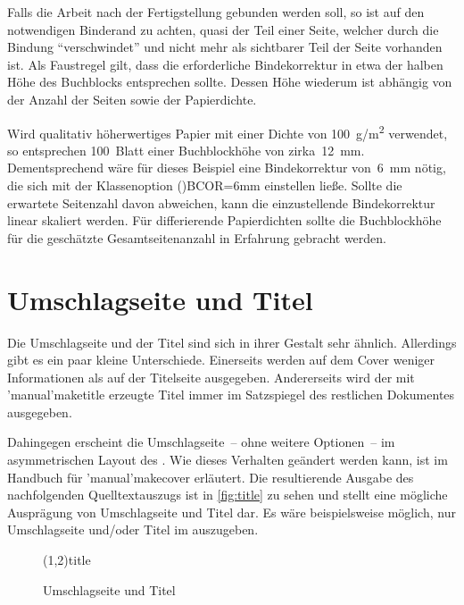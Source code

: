 \documentclass[%
  english,ngerman,%
  cdgeometry=no,DIV=12,%
  cd=false,cdfont=false,cdtitle=true,%
  headings=normal,%
  automark,%
  listof=toc,%
]{tudscrartcl}
\begin{document}
Falls die Arbeit nach der Fertigstellung gebunden werden soll, so ist auf den 
notwendigen Binderand zu achten, quasi der Teil einer Seite, welcher durch die 
Bindung \enquote{verschwindet} und nicht mehr als sichtbarer Teil der Seite 
vorhanden ist. Als Faustregel gilt, dass die erforderliche Bindekorrektur in 
etwa der halben Höhe des Buchblocks entsprechen sollte. Dessen Höhe wiederum 
ist abhängig von der Anzahl der Seiten sowie der Papierdichte.

Wird qualitativ höherwertiges Papier mit einer Dichte von \SI{100}{g/m^2} 
verwendet, so entsprechen 100~Blatt einer Buchblockhöhe von zirka~\SI{12}{mm}. 
Dementsprechend wäre für dieses Beispiel eine Bindekorrektur von~\SI{6}{mm} 
nötig, die sich mit der Klassenoption \Option*(){BCOR=6mm} 
einstellen ließe. Sollte die erwartete Seitenzahl davon abweichen, kann die 
einzustellende Bindekorrektur linear skaliert werden. Für differierende 
Papierdichten sollte die Buchblockhöhe für die geschätzte Gesamtseitenanzahl in 
Erfahrung gebracht werden.



\section{Umschlagseite und Titel}

Die Umschlagseite und der Titel sind sich in ihrer Gestalt sehr ähnlich. 
Allerdings gibt es ein paar kleine Unterschiede. Einerseits werden auf dem 
Cover weniger Informationen als auf der Titelseite ausgegeben. Andererseits 
wird der mit \Macro'manual'{maketitle} erzeugte Titel immer im Satzspiegel des 
restlichen Dokumentes ausgegeben.

Dahingegen erscheint die Umschlagseite~-- ohne weitere Optionen~-- im 
asymmetrischen Layout des \TUDCDs. Wie dieses Verhalten geändert werden kann, 
ist im Handbuch für \Macro'manual'{makecover} erläutert. Die resultierende 
Ausgabe des nachfolgenden Quelltextauszugs ist in \autoref{fig:title} zu sehen 
und stellt eine mögliche Ausprägung von Umschlagseite und Titel dar. Es wäre 
beispielsweise möglich, nur Umschlagseite und/oder Titel im \TUDCD auszugeben. 
%
\begin{figure}
\IncludeStandalone(1,2){title}
\caption{%
  Umschlagseite und Titel%
  \label{fig:title}%
}
\end{figure}
\end{document}
